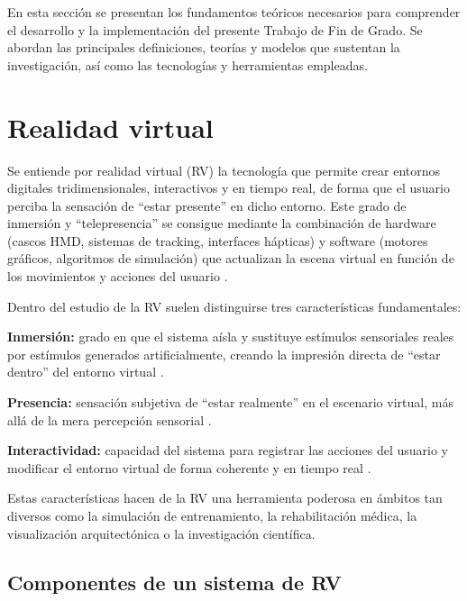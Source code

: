 En esta sección se presentan los fundamentos teóricos necesarios para comprender el desarrollo y la implementación del presente Trabajo de Fin de Grado. Se abordan las principales definiciones, teorías y modelos que sustentan la investigación, así como las tecnologías y herramientas empleadas. 
\section{Realidad virtual}
Se entiende por realidad virtual (RV) la tecnología que permite crear entornos digitales tridimensionales, interactivos y en tiempo real, de forma que el usuario perciba la sensación de “estar presente” en dicho entorno. Este grado de inmersión y “telepresencia” se consigue mediante la combinación de hardware (cascos HMD, sistemas de tracking, interfaces hápticas) y software (motores gráficos, algoritmos de simulación) que actualizan la escena virtual en función de los movimientos y acciones del usuario \cite{steuer92,sherman2002}.

Dentro del estudio de la RV suelen distinguirse tres características fundamentales:

\textbf{Inmersión:} grado en que el sistema aísla y sustituye estímulos sensoriales reales por estímulos generados artificialmente, creando la impresión directa de “estar dentro” del entorno virtual \cite{milgram94}.

\textbf{Presencia:} sensación subjetiva de “estar realmente” en el escenario virtual, más allá de la mera percepción sensorial \cite{sherman2002,slater94}.

\textbf{Interactividad:} capacidad del sistema para registrar las acciones del usuario y modificar el entorno virtual de forma coherente y en tiempo real \cite{steuer92,milgram94}.

Estas características hacen de la RV una herramienta poderosa en ámbitos tan diversos como la simulación de entrenamiento, la rehabilitación médica, la visualización arquitectónica o la investigación científica.

\subsection{Componentes de un sistema de RV}

